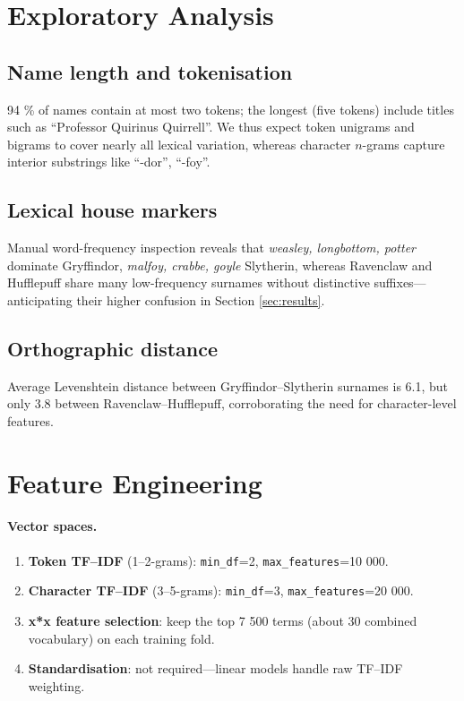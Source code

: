 \documentclass[12pt,a4paper]{article}
\begin{document}
\section{Exploratory Analysis}\label{sec:eda}

\subsection{Name length and tokenisation}

94 \% of names contain at most two tokens; the longest (five tokens)
include titles such as “Professor Quirinus Quirrell”.  We thus expect
token unigrams and bigrams to cover nearly all lexical variation,
whereas character $n$-grams capture interior substrings like “-dor”,
“-foy”.

\subsection{Lexical house markers}

Manual word-frequency inspection reveals that
\emph{weasley, longbottom, potter} dominate Gryffindor,
\emph{malfoy, crabbe, goyle} Slytherin, whereas Ravenclaw and
Hufflepuff share many low-frequency surnames without distinctive
suffixes—anticipating their higher confusion in Section \ref{sec:results}.

\subsection{Orthographic distance}

Average Levenshtein distance between Gryffindor–Slytherin surnames is
6.1, but only 3.8 between Ravenclaw–Hufflepuff, corroborating the need
for character-level features.

\section{Feature Engineering}\label{sec:fe}

\paragraph{Vector spaces.}

\begin{enumerate}[leftmargin=2em]
  \item \textbf{Token TF–IDF} (1–2-grams): \texttt{min\_df}=2,
        \texttt{max\_features}=10 000.
  \item \textbf{Character TF–IDF} (3–5-grams): \texttt{min\_df}=3,
        \texttt{max\_features}=20 000.
  \item \textbf{x*x feature selection}: keep the top 7 500 terms (about 30 %
        combined vocabulary) on each training fold.
  \item \textbf{Standardisation}: not required—linear models handle raw
        TF–IDF weighting.
\end{enumerate}
\end{document}

